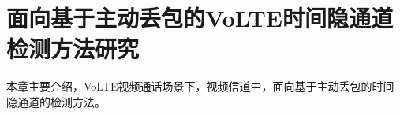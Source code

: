 \chapter{面向基于主动丢包的VoLTE时间隐通道检测方法研究}
\label{chap:analyze}

本章主要介绍，VoLTE视频通话场景下，视频信道中，面向基于主动丢包的时间隐通道的检测方法。






